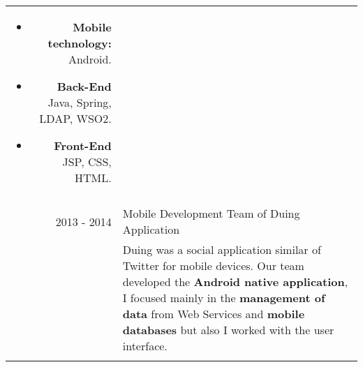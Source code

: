 \documentclass[a4paper,10pt]{article} %
\begin{document}
\begin{tabular}{r|p{11cm}}
{\begin{enumerate}
\begin{itemize}
\item \textbf{Mobile technology:} Android.
\item \textbf{Back-End} Java, Spring, LDAP, WSO2.
\item \textbf{Front-End} JSP, CSS, HTML.
\end{itemize}
\end{enumerate}} \\
\multicolumn{2}{c}{} \\
\textsc{2013 - 2014} & Mobile Development Team of Duing Application\\
& \footnotesize{Duing was a social application similar of Twitter for mobile devices. Our team developed the \textbf{Android native application}, I focused mainly in the \textbf{management of data} from Web Services and \textbf{mobile databases} but also I worked with the user interface.}\\
\multicolumn{2}{c}{} \\
\end{tabular}



\end{document}
